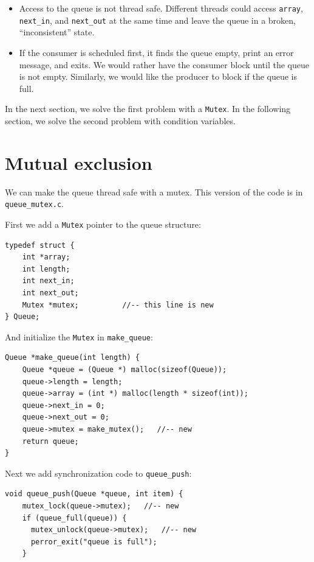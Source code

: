 \documentclass[12pt]{book}
\begin{document}
{\begin{itemize}

\item Access to the queue is not thread safe.  Different threads
could access {\tt array}, \verb"next_in", and \verb"next_out"
at the same time and leave the queue in a broken, ``inconsistent''
state.

\item If the consumer is scheduled first, it finds the queue empty,
print an error message, and exits.  We would rather have the consumer
block until the queue is not empty.  Similarly, we would like the
producer to block if the queue is full.

\end{itemize}

In the next section, we solve the first problem with a {\tt Mutex}.
In the following section, we solve the second problem with condition
variables.


\section{Mutual exclusion}

We can make the queue thread safe with a mutex.  This version
of the code is in \verb"queue_mutex.c".

First we add a {\tt Mutex} pointer to the queue structure:

\begin{verbatim}
typedef struct {
    int *array;
    int length;
    int next_in;
    int next_out;
    Mutex *mutex;          //-- this line is new
} Queue;
\end{verbatim}

And initialize the {\tt Mutex} in \verb"make_queue":

\begin{verbatim}
Queue *make_queue(int length) {
    Queue *queue = (Queue *) malloc(sizeof(Queue));
    queue->length = length;
    queue->array = (int *) malloc(length * sizeof(int));
    queue->next_in = 0;
    queue->next_out = 0;
    queue->mutex = make_mutex();   //-- new
    return queue;
}
\end{verbatim}

Next we add synchronization code to \verb"queue_push":

\begin{verbatim}
void queue_push(Queue *queue, int item) {
    mutex_lock(queue->mutex);   //-- new
    if (queue_full(queue)) {
      mutex_unlock(queue->mutex);   //-- new
      perror_exit("queue is full");
    }
  

\end{verbatim}}
\end{document}
